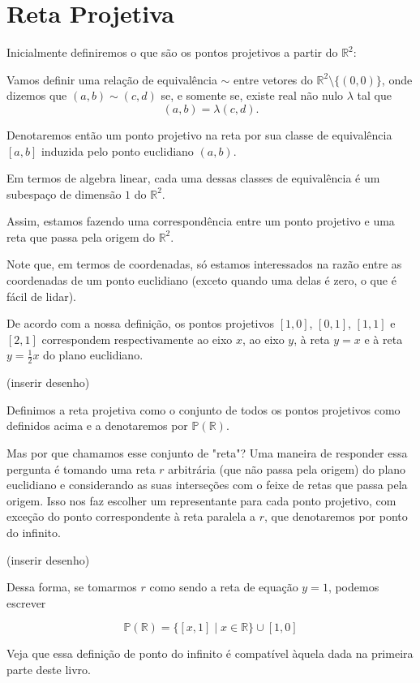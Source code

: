 \chapter{Reta Projetiva}

Inicialmente definiremos o que são os pontos projetivos a partir do $\mathbb{R}^2$:

\begin{defn}
Vamos definir uma relação de equivalência \(\sim\) entre vetores do $\mathbb{R}^2 \setminus \{(0, 0)\}$,
onde dizemos que \((a,b) \sim (c,d)\) se, e somente se, existe real não nulo \(\lambda\) tal que \[(a,b)=\lambda (c,d).\]

Denotaremos então um ponto projetivo na reta por sua classe de equivalência $[a,b]$ induzida pelo ponto euclidiano $(a,b)$.
\end{defn} 

Em termos de algebra linear, cada uma dessas classes de equivalência é um subespaço de dimensão $1$ do $\mathbb{R}^2$.

Assim, estamos fazendo uma correspondência entre um ponto projetivo e uma reta que passa pela origem do $\mathbb{R}^2$.

Note que, em termos de coordenadas, só estamos interessados na razão entre as coordenadas de um ponto euclidiano (exceto quando uma delas é zero, o que é fácil de lidar).

\begin{exmp}
De acordo com a nossa definição, os pontos projetivos $[1,0]$, $[0,1]$, $[1,1]$ e $[2,1]$ correspondem respectivamente ao eixo $x$, ao eixo $y$, à reta $y=x$ e à reta $y=\frac{1}{2}x$ do plano euclidiano.

(inserir desenho)
\end{exmp}


\begin{defn}
Definimos a reta projetiva como o conjunto de todos os pontos projetivos como definidos acima e a denotaremos por $\mathbb{P}(\mathbb{R})$.

\end{defn}

Mas por que chamamos esse conjunto de "reta"? Uma maneira de responder essa pergunta é tomando uma reta $r$ arbitrária (que não passa pela origem) do plano euclidiano e considerando as suas interseções com o feixe de retas que passa pela origem. Isso nos faz escolher um representante para cada ponto projetivo, com exceção do ponto correspondente à reta paralela a $r$, que denotaremos por ponto do infinito. 

(inserir desenho)

Dessa forma, se tomarmos $r$ como sendo a reta de equação $y=1$, podemos escrever

$$\mathbb{P}(\mathbb{R})=\{[x,1]\mid x\in \mathbb{R}\}\cup {[1,0]}$$

Veja que essa definição de ponto do infinito é compatível àquela dada na primeira parte deste livro.
